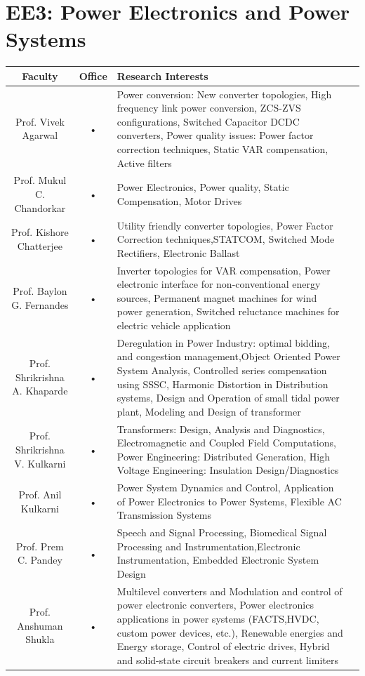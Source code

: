 \documentclass[11pt,fleqn,openany]{book} %
\begin{document}
\section{EE3: Power Electronics and Power Systems}
\begin{tabular}{|c|c|p{6cm}|c}
\hline 
Faculty  & Office  & Research Interests \\ 
\hline 
Prof. Vivek Agarwal & • & Power conversion: New converter topologies, High frequency link
power conversion, ZCS-ZVS configurations, Switched Capacitor DCDC converters, Power quality issues: Power factor correction techniques, Static VAR compensation, Active filters \\ 
\hline 
Prof. Mukul C. Chandorkar & • & Power Electronics, Power quality, Static Compensation, Motor Drives \\ 
\hline 
Prof. Kishore Chatterjee & • & Utility friendly converter topologies, Power Factor Correction techniques,STATCOM, Switched Mode Rectifiers, Electronic Ballast \\ 
\hline 
Prof. Baylon G. Fernandes & • & Inverter topologies for VAR compensation, Power electronic interface for non-conventional energy sources, Permanent magnet machines for
wind power generation, Switched reluctance machines for electric vehicle application \\ 
\hline 
Prof. Shrikrishna A. Khaparde & • & Deregulation in Power Industry: optimal bidding, and congestion management,Object Oriented Power System Analysis, Controlled series compensation using SSSC, Harmonic Distortion in Distribution systems, Design and Operation of small tidal power plant, Modeling and Design of transformer \\ 
\hline 
Prof. Shrikrishna V. Kulkarni & • & Transformers: Design, Analysis and Diagnostics, Electromagnetic and Coupled Field Computations, Power Engineering: Distributed Generation, High Voltage Engineering: Insulation Design/Diagnostics \\ 
\hline 
Prof. Anil Kulkarni & • & Power System Dynamics and Control, Application of Power Electronics to Power Systems, Flexible AC Transmission Systems \\ 
\hline 
Prof. Prem C. Pandey & • & Speech and Signal Processing, Biomedical Signal Processing and Instrumentation,Electronic Instrumentation, Embedded Electronic System Design \\ 
\hline 
Prof. Anshuman Shukla & • & Multilevel converters and Modulation and control of power electronic converters, Power electronics applications in power systems (FACTS,HVDC, custom power devices, etc.), Renewable energies and Energy storage, Control of electric drives, Hybrid and solid-state circuit breakers and current limiters \\ \hline 

\end{tabular}
\end{document}
